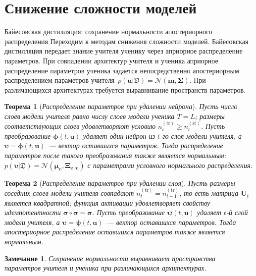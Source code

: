 \documentclass[10pt,pdf,hyperref={unicode}]{beamer}
\newtheorem{rustheorem}{Теорема}
\newtheorem{rusremark}{Замечание}
\begin{document}
\section{Снижение сложности моделей}
\begin{frame}{Байесовская дистилляция: сохранение нормальности апостериорного распределения}
\justifying
\footnotesize
Переходим к методам снижения сложности моделей. Байесовская дистилляция передает знание учителя ученику через априорное распределение параметров. При совпадении архитектур учителя и ученика априорное распределение параметров ученика задается непосредственно апостериорным распределением параметров учителя~$p(\mathbf{u}|\mathfrak{D})=\mathcal{N}(\mathbf{m},\boldsymbol{\Sigma})$. При различающихся архитектурах требуется выравнивание пространств параметров.

\begin{rustheorem}[\emph{Распределение параметров при удалении нейрона}]
    \justifying
    Пусть число слоев модели учителя равно числу слоев модели ученика $T=L$; размеры соответствующих слоев удовлетворяют условию $n_t^{(\mathrm{tr})}\ge n_t^{(\mathrm{st})}$. Пусть преобразование $\boldsymbol{\phi}(t,\mathbf{u})$ удаляет один нейрон из $t$-го слоя модели учителя, а $\boldsymbol{\upsilon}=\boldsymbol{\phi}(t,\mathbf{u})$~--- вектор оставшихся параметров. Тогда распределение параметров после такого преобразования также является нормальным: $p(\boldsymbol{\upsilon}|\mathfrak{D})=\mathcal{N}(\boldsymbol{\mu}_{\boldsymbol{\upsilon}},\boldsymbol{\Xi}_{\boldsymbol{\upsilon},\boldsymbol{\upsilon}})$ с параметрами условного нормального распределения.
\end{rustheorem}

\begin{rustheorem}[\emph{Распределение параметров при удалении слоя}]
    \justifying
    Пусть размеры соседних слоев модели учителя совпадают $n_t^{(\mathrm{tr})}=n_{t-1}^{(\mathrm{tr})}$, то есть матрица $\mathbf{U}_t$ является квадратной; функция активации удовлетворяет свойству идемпотентности $\boldsymbol{\sigma}\circ\boldsymbol{\sigma}=\boldsymbol{\sigma}$. Пусть преобразование $\boldsymbol{\psi}(t,\mathbf{u})$ удаляет $t$-й слой модели учителя, а $\boldsymbol{\upsilon}=\boldsymbol{\psi}(t,\mathbf{u})$~--- вектор оставшихся параметров. Тогда апостериорное распределение оставшихся параметров также является нормальным.
\end{rustheorem}

\begin{rusremark}
    \justifying
    Сохранение нормальности выравнивает пространства параметров учителя и ученика при различающихся архитектурах.
\end{rusremark}
\end{frame}
\end{document}
